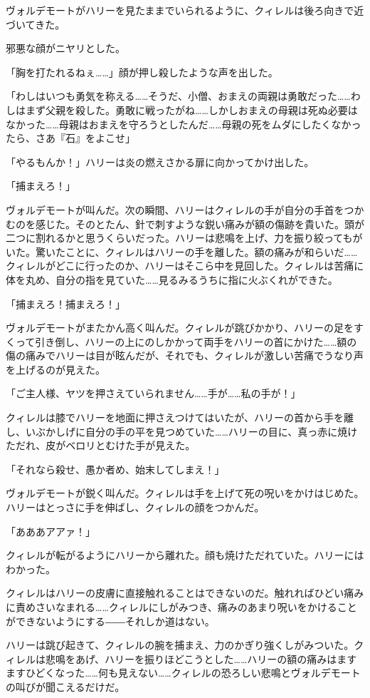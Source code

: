 \documentclass[10pt,a4paper]{article}
\begin{document}
\begin{CJK}{UTF8}{min}
ヴォルデモートがハリーを見たままでいられるように、クィレルは後ろ向きで近づいてきた。

邪悪な顔がニヤリとした。

「胸を打たれるねぇ……」顔が押し殺したような声を出した。

「わしはいつも勇気を称える……そうだ、小僧、おまえの両親は勇敢だった……わしはまず父親を殺した。勇敢に戦ったがね……しかしおまえの母親は死ぬ必要はなかった……母親はおまえを守ろうとしたんだ……母親の死をムダにしたくなかったら、さあ『石』をよこせ」

「やるもんか！」ハリーは炎の燃えさかる扉に向かってかけ出した。

「捕まえろ！」

ヴォルデモートが叫んだ。次の瞬間、ハリーはクィレルの手が自分の手首をつかむのを感じた。そのとたん、針で刺すような鋭い痛みが額の傷跡を貴いた。頭が二つに割れるかと思うくらいだった。ハリーは悲鳴を上げ、力を振り絞ってもがいた。驚いたことに、クィレルはハリーの手を離した。額の痛みが和らいだ……クィレルがどこに行ったのか、ハリーはそこら中を見回した。クィレルは苦痛に体を丸め、自分の指を見ていた……見るみるうちに指に火ぶくれができた。

「捕まえろ！捕まえろ！」

ヴォルデモートがまたかん高く叫んだ。クィレルが跳びかかり、ハリーの足をすくって引き倒し、ハリーの上にのしかかって両手をハリーの首にかけた……額の傷の痛みでハリーは目が眩んだが、それでも、クィレルが激しい苦痛でうなり声を上げるのが見えた。

「ご主人様、ヤツを押さえていられません……手が……私の手が！」

クィレルは膝でハリーを地面に押さえつけてはいたが、ハリーの首から手を離し、いぶかしげに自分の手の平を見つめていた……ハリーの目に、真っ赤に焼けただれ、皮がベロリとむけた手が見えた。

「それなら殺せ、愚か者め、始末してしまえ！」

ヴォルデモートが鋭く叫んだ。クィレルは手を上げて死の呪いをかけはじめた。ハリーはとっさに手を伸ばし、クィレルの顔をつかんだ。

「あああアアァ！」

クィレルが転がるようにハリーから離れた。顔も焼けただれていた。ハリーにはわかった。

クィレルはハリーの皮膚に直接触れることはできないのだ。触れればひどい痛みに責めさいなまれる……クィレルにしがみつき、痛みのあまり呪いをかけることができないようにする――それしか道はない。

ハリーは跳び起きて、クィレルの腕を捕まえ、力のかぎり強くしがみついた。クィレルは悲鳴をあげ、ハリーを振りほどこうとした……ハリーの額の痛みはますますひどくなった……何も見えない……クィレルの恐ろしい悲鳴とヴォルデモートの叫びが聞こえるだけだ。


\end{CJK}
\end{document}

